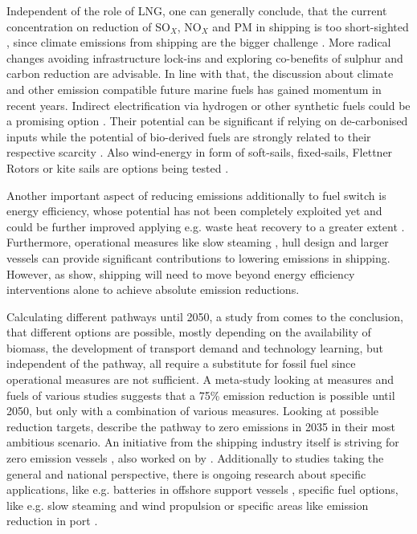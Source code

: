 \documentclass[article]{elsarticle}
\begin{document}
Independent of the role of LNG, one can generally conclude, that the current concentration on reduction of SO$_X$, NO$_X$ and PM in shipping is too short-sighted \cite{Gilbert2014}, since climate emissions from shipping are the bigger challenge \cite{FRIDELL2019}. More radical changes avoiding infrastructure lock-ins and exploring co-benefits of sulphur and carbon reduction are advisable.
%
In line with that, the discussion about climate and other emission compatible future marine fuels has gained momentum in recent years. Indirect electrification via hydrogen or other synthetic fuels could be a promising option \cite{HORVATH2018}. Their potential can be significant if relying on de-carbonised inputs while the potential of bio-derived fuels are strongly related to their respective scarcity \cite{Gilbert2014}. Also wind-energy in form of soft-sails, fixed-sails, Flettner Rotors or kite sails are options being tested \cite{IRENA2015}.

Another important aspect of reducing emissions additionally to fuel switch is energy efficiency, whose potential has not been completely exploited yet \cite{JAFARZADEH2014,CHI2018} and could be further improved applying e.g. waste heat recovery to a greater extent \cite{Baldi2015}. Furthermore, operational measures like slow steaming \cite{ARMSTRONG2013}, hull design and larger vessels \cite{LINDSTAD2015} can provide significant contributions to lowering emissions in shipping. However, as \citet{Olmer2017} show, shipping will need to move beyond energy efficiency interventions alone to achieve absolute emission reductions.

Calculating different pathways until 2050, a study from \citet{LloydsRegister2016} comes to the conclusion, that different options are possible, mostly depending on the availability of biomass, the development of transport demand and technology learning, but independent of the pathway, all require a substitute for fossil fuel since operational measures are not sufficient. A meta-study looking at measures and fuels of various studies \cite{Bouman2017} suggests that a 75\% emission reduction is possible until 2050, but only with a combination of various measures. Looking at possible reduction targets, \citet{Smith2016} describe the pathway to zero emissions in 2035 in their most ambitious scenario. An initiative from the shipping industry itself is striving for zero emission vessels \cite{SSI2018}, also worked on by \citet{LloydsRegister2017}.
%
Additionally to studies taking the general and national perspective, there is ongoing research about specific applications, like e.g. batteries in offshore support vessels \cite{Lindstad2017}, specific fuel options, like e.g. slow steaming and wind propulsion \cite{MANDER2017} or specific areas like emission reduction in port \cite{WINNES2015}.
\end{document}
